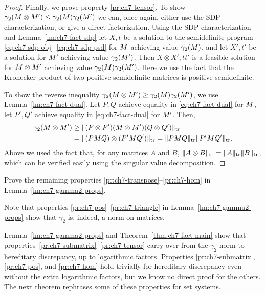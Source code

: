 \begin{proof}
\smallskip
  Finally, we prove property \ref{pr:ch7-tensor}.  
  To
  show
  $\gamma_2(M \otimes M') \le \gamma_2(M) \gamma_2(M')$ we
  can, once again, either use the SDP characterization, or give a
  direct factorization. Using the SDP characterization and Lemma~\ref{lm:ch7-fact-sdp} let $X, t$ be
  a solution to the semidefinite program
  \eqref{eq:ch7-sdp-obj}--\eqref{eq:ch7-sdp-psd} for $M$ achieving
  value $\gamma_2(M)$, and let $X', t'$ be
  a solution for $M'$ achieving value $\gamma_2(M')$. Then $X\otimes X', tt'$ is a
  feasible solution for $M\otimes M'$ achieving value
  $\gamma_2(M)\gamma_2(M')$. Here we use the fact that the
  Kronecker product of two positive semidefinite matrices is positive
  semidefinite. 
  
  To show the reverse inequality $\gamma_2(M\otimes
  M') \ge \gamma_2(M)\gamma_2(M')$, we use
  Lemma~\ref{lm:ch7-fact-dual}. Let $P,Q$ achieve equality in
  \eqref{eq:ch7-fact-dual} for $M$, let $P', Q'$ achieve
  equality in \eqref{eq:ch7-fact-dual} for $M'$. Then,
  \begin{align*}
    \gamma_2(M\otimes M') &\ge
    \|(P\otimes P') (M \otimes M') (Q\otimes Q')\|_{\operatorname{tr}}\\
    &=
    \|(PM Q)\otimes (P'M Q')\|_{\operatorname{tr}}
    =
   \|PM Q\|_{\operatorname{tr}}\|P'M Q'\|_{\operatorname{tr}}.
 \end{align*}
 Above we used the fact that, for any matrices $A$ and $B$,
 $\|A\otimes B\|_{\operatorname{tr}} = \|A\|_{\operatorname{tr}}\|B\|_{\operatorname{tr}}$, which can be verified
 easily using the singular value decomposition. 
\end{proof}

\begin{exercise}
  Prove the remaining properties
  \ref{pr:ch7-transpose}--\ref{pr:ch7-hom} in Lemma~\ref{lm:ch7-gamma2-props}.
\end{exercise}

Note that properties \ref{pr:ch7-pos}--\ref{pr:ch7-triangle} in
Lemma~\ref{lm:ch7-gamma2-props} show that $\gamma_2$ is, indeed, a
norm on matrices.

Lemma~\ref{lm:ch7-gamma2-props} and Theorem~\ref{thm:ch7-fact-main}
show that properties~\ref{pr:ch7-submatrix}--\ref{pr:ch7-tensor} carry
over from the $\gamma_2$ norm to hereditary discrepancy, up to
logarithmic factors. Properties \ref{pr:ch7-submatrix},
\ref{pr:ch7-pos}, and \ref{pr:ch7-hom} hold trivially for
hereditary discrepancy even without the extra logarithmic factors, but
we know no direct proof for the others. The next theorem rephrases
some of these properties for set systems.


